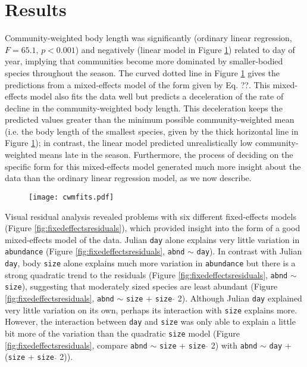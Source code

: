 \documentclass[12pt]{ecology}
\begin{document}
\section{Results}

Community-weighted body length was significantly (ordinary linear regression, $F = 65.1$, $p < 0.001$) and negatively (linear model in Figure \ref{fig:cwmfits}) related to day of year, implying that communities become more dominated by smaller-bodied species throughout the season.  The curved dotted line in Figure \ref{fig:cwmfits} gives the predictions from a mixed-effects model of the form given by Eq. ??.  This mixed-effects model also fits the data well but predicts a deceleration of the rate of decline in the community-weighted body length.  This deceleration keeps the predicted values greater than the minimum possible community-weighted mean (i.e. the body length of the smallest species, given by the thick horizontal line in Figure \ref{fig:cwmfits}); in contrast, the linear model predicted unrealistically low community-weighted means late in the season.  Furthermore, the process of deciding on the specific form for this mixed-effects model generated much more insight about the data than the ordinary linear regression model, as we now describe.

\begin{figure}
\texttt{[image: cwmfits.pdf]}
\caption{}
\label{fig:cwmfits}
\end{figure}

Visual residual analysis revealed problems with six different fixed-effects models (Figure \ref{fig:fixedeffectsresiduals}), which provided insight into the form of a good mixed-effects model of the data.  Julian \texttt{day} alone explains very little variation in \texttt{abundance} (Figure \ref{fig:fixedeffectsresiduals}, \texttt{abnd} $\sim$ \texttt{day}).  In contrast with Julian \texttt{day}, body \texttt{size} alone explains much more variation in \texttt{abundance} but there is a strong quadratic trend to the residuals (Figure \ref{fig:fixedeffectsresiduals}, \texttt{abnd} $\sim$ \texttt{size}), suggesting that moderately sized species are least abundant (Figure \ref{fig:fixedeffectsresiduals}, \texttt{abnd} $\sim$ \texttt{size} + \texttt{size} $\hat{}$ 2).  Although Julian \texttt{day} explained very little variation on its own, perhaps its interaction with \texttt{size} explains more.  However, the interaction between \texttt{day} and \texttt{size} was only able to explain a little bit more of the variation than the quadratic \texttt{size} model (Figure \ref{fig:fixedeffectsresiduals}, compare \texttt{abnd} $\sim$ \texttt{size} + \texttt{size} $\hat{}$ 2) with \texttt{abnd} $\sim$ \texttt{day} + (\texttt{size} + \texttt{size} $\hat{}$ 2)).  
\end{document}
